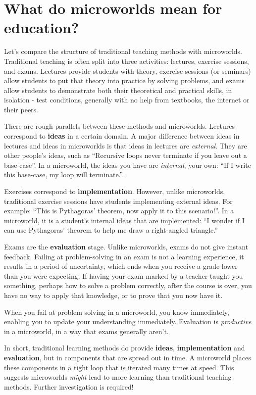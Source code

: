 \section{What do microworlds mean for education?}

Let's compare the structure of traditional teaching methods with
microworlds. Traditional teaching is often split into three activities:
lectures, exercise sessions, and exams. Lectures provide students with
theory, exercise sessions (or seminars) allow students to put that
theory into practice by solving problems, and exams allow students to
demonstrate both their theoretical and practical skills, in isolation -
test conditions, generally with no help from textbooks, the internet or
their peers.

There are rough parallels between these methods and microworlds.
Lectures correspond to \textbf{ideas} in a certain domain. A major
difference between ideas in lectures and ideas in microworlds is that
ideas in lectures are \emph{external}. They are other people's ideas,
such as ``Recursive loops never terminate if you leave out a
base-case''. In a microworld, the ideas you have are \emph{internal},
your own: ``If I write this base-case, my loop will terminate.''.

Exercises correspond to \textbf{implementation}. However, unlike
microworlds, traditional exercise sessions have students implementing
external ideas. For example: ``This is Pythagoras' theorem, now apply it
to this scenario!''. In a microworld, it is a student's internal ideas
that are implemented: ``I wonder if I can use Pythagoras' theorem to
help me draw a right-angled triangle.''

Exams are the \textbf{evaluation} stage. Unlike microworlds, exams do
not give instant feedback. Failing at problem-solving in an exam is not
a learning experience, it results in a period of uncertainty, which ends
when you receive a grade lower than you were expecting. If having your exam marked by a teacher
taught you something, perhaps how to solve a problem correctly, after
the course is over, you have no way to apply that knowledge, or to prove
that you now have it.

When you fail at problem solving in a microworld, you know immediately,
enabling you to update your understanding immediately. Evaluation is
\emph{productive} in a microworld, in a way that exams generally aren't.

In short, traditional learning methods do provide \textbf{ideas},
\textbf{implementation} and \textbf{evaluation}, but in components that
are spread out in time. A microworld places these components in a tight
loop that is iterated many times at speed. This suggests 
microworlds \textit{might} lead to more learning than traditional teaching methods. Further investigation is required!

